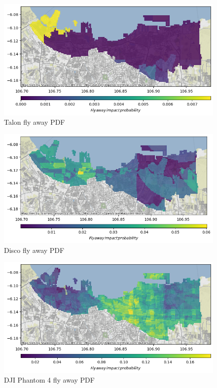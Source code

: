 \documentclass[12pt]{report}
\begin{document}
        \begin{figure}[H]
            \centering
            \includegraphics[width=\textwidth]{Plot/talon/fly_away_pdf.png}
            \caption{Talon fly away PDF}
        \end{figure}
        \begin{figure}[H]
            \centering
            \includegraphics[width=\textwidth]{Plot/parrot/fly_away_pdf.png}
            \caption{Disco fly away PDF}
        \end{figure}
        \begin{figure}[H]
            \centering
            \includegraphics[width=\textwidth]{Plot/phantom4/fly_away_pdf.png}
            \caption{DJI Phantom 4 fly away PDF}
        \end{figure}
\end{document}
